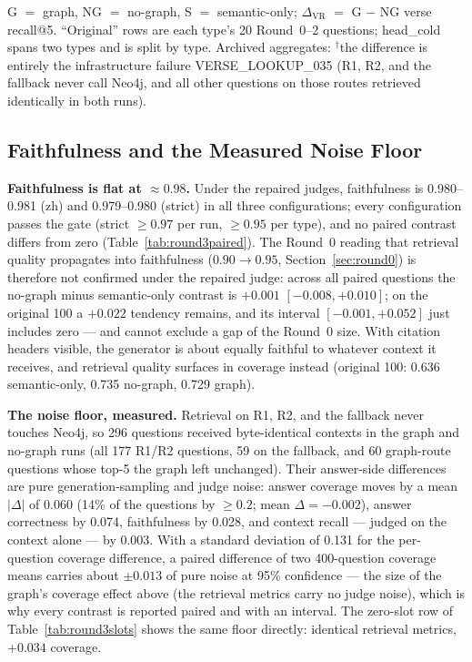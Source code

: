 \begin{table}[!t]
\begin{threeparttable}
\begin{tabular}{@{}lrccccccccccr@{}}
\bottomrule
\end{tabular}
\begin{tablenotes}\footnotesize
\item G $=$ graph, NG $=$ no-graph, S $=$ semantic-only;
$\Delta_{\mathrm{VR}}$ $=$ G $-$ NG verse recall@5. ``Original'' rows
are each type's 20 Round~0--2 questions; head\_cold spans two types and
is split by type. Archived aggregates: $^\dagger$the difference is
entirely the infrastructure failure VERSE\_LOOKUP\_035 (R1, R2, and the
fallback never call Neo4j, and all other questions on those routes
retrieved identically in both runs).
\end{tablenotes}
\end{threeparttable}
\end{table}

\subsection{Faithfulness and the Measured Noise Floor}

\textbf{Faithfulness is flat at $\approx 0.98$.} Under the repaired
judges, faithfulness is 0.980--0.981 (zh) and 0.979--0.980 (strict) in
all three configurations; every configuration passes the gate (strict
$\ge 0.97$ per run, $\ge 0.95$ per type), and no paired contrast differs
from zero (Table~\ref{tab:round3paired}). The Round~0 reading that
retrieval quality propagates into faithfulness ($0.90\to0.95$,
Section~\ref{sec:round0}) is therefore not confirmed under the repaired
judge: across all paired questions the no-graph minus semantic-only
contrast is $+0.001$ $[-0.008, +0.010]$; on the original 100 a $+0.022$
tendency remains, and its interval $[-0.001, +0.052]$ just includes
zero --- and cannot exclude a gap of the Round~0 size. With citation
headers visible, the generator is about equally faithful to whatever
context it receives, and retrieval quality surfaces in coverage instead
(original 100: 0.636 semantic-only, 0.735 no-graph, 0.729 graph).

\textbf{The noise floor, measured.} Retrieval on R1, R2, and the
fallback never touches Neo4j, so 296 questions received byte-identical
contexts in the graph and no-graph runs (all 177 R1/R2 questions, 59 on
the fallback, and 60 graph-route questions whose top-5 the graph left
unchanged). Their answer-side differences are pure generation-sampling
and judge noise: answer coverage moves by a mean $|\Delta|$ of 0.060
(14\% of the questions by $\ge 0.2$; mean $\Delta=-0.002$), answer
correctness by 0.074, faithfulness by 0.028, and context recall ---
judged on the context alone --- by 0.003. With a standard deviation
of 0.131 for the per-question coverage difference, a paired difference
of two 400-question coverage means carries about $\pm 0.013$ of pure
noise at 95\% confidence --- the size of the graph's coverage effect
above (the retrieval metrics carry no judge noise), which is why every
contrast is reported paired and with an interval. The zero-slot row of Table~\ref{tab:round3slots} shows the
same floor directly: identical retrieval metrics, $+0.034$ coverage.

